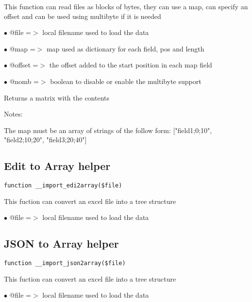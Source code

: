 \documentclass[a4paper]{book}
\begin{document}
This function can read files as blocks of bytes, they can use a map, can specify
an offset and can be used using multibyte if it is needed

\begin{compactitem}
\item[\color{myblue}$\bullet$] @file   =$>$ local filename used to load the data
\item[\color{myblue}$\bullet$] @map    =$>$ map used as dictionary for each field, pos and length
\item[\color{myblue}$\bullet$] @offset =$>$ the offset added to the start position in each map field
\item[\color{myblue}$\bullet$] @nomb   =$>$ boolean to disable or enable the multibyte support
\end{compactitem}

Returns a matrix with the contents

Notes:

The map must be an array of strings of the follow form:
["field1;0;10", "field2;10;20", "field3;20;40"]

\hypertarget{toc156}{}
\subsection{Edit to Array helper}

\begin{lstlisting}
function __import_edi2array($file)
\end{lstlisting}

This fuction can convert an excel file into a tree structure

\begin{compactitem}
\item[\color{myblue}$\bullet$] @file =$>$ local filename used to load the data
\end{compactitem}

\hypertarget{toc157}{}
\subsection{JSON to Array helper}

\begin{lstlisting}
function __import_json2array($file)
\end{lstlisting}

This fuction can convert an excel file into a tree structure

\begin{compactitem}
\item[\color{myblue}$\bullet$] @file =$>$ local filename used to load the data
\end{compactitem}
\end{document}

